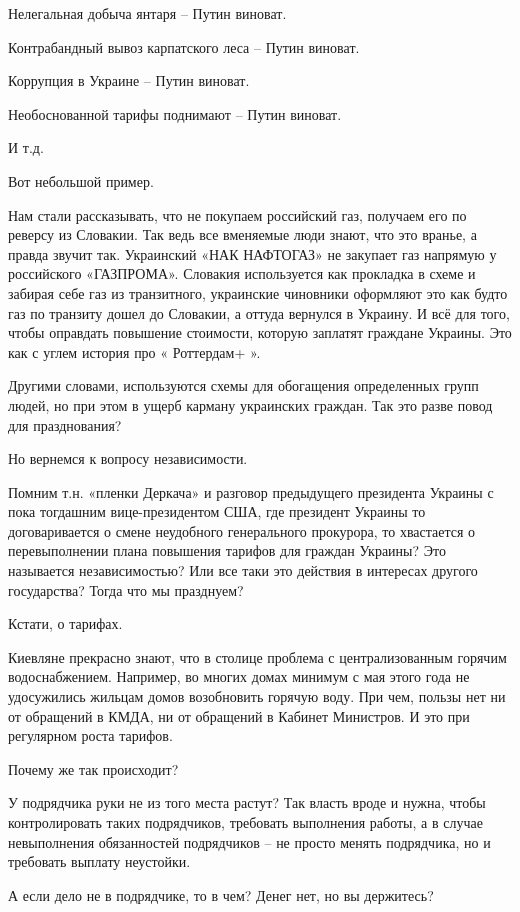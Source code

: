 Нелегальная добыча янтаря – Путин виноват.

Контрабандный вывоз карпатского леса – Путин виноват.

Коррупция в Украине – Путин виноват.

Необоснованной тарифы поднимают – Путин виноват.

И т.д.

Вот небольшой пример.

Нам стали рассказывать, что не покупаем российский газ, получаем его по реверсу
из Словакии. Так ведь все вменяемые люди знают, что это вранье, а правда звучит
так. Украинский «НАК НАФТОГАЗ» не закупает газ напрямую у российского
«ГАЗПРОМА». Словакия используется как прокладка в схеме и забирая себе газ из
транзитного, украинские чиновники оформляют это как будто газ по транзиту дошел
до Словакии, а оттуда вернулся в Украину. И всё для того, чтобы оправдать
повышение стоимости, которую заплатят граждане Украины. Это как с углем история
про « Роттердам+ ».

Другими словами, используются схемы для обогащения определенных групп людей, но
при этом в ущерб карману украинских граждан. Так это разве повод для
празднования?

Но вернемся к вопросу независимости.

Помним т.н. «пленки Деркача» и разговор предыдущего президента Украины с пока
тогдашним вице-президентом США, где президент Украины то договаривается о смене
неудобного генерального прокурора, то хвастается о перевыполнении плана
повышения тарифов для граждан Украины? Это называется независимостью? Или все
таки это действия в интересах другого государства? Тогда что мы празднуем?

Кстати, о тарифах.

Киевляне прекрасно знают, что в столице проблема с централизованным горячим
водоснабжением. Например, во многих домах минимум с мая этого года не
удосужились жильцам домов возобновить горячую воду. При чем, пользы нет ни от
обращений в КМДА, ни от обращений в Кабинет Министров. И это при регулярном
роста тарифов.

Почему же так происходит?

У подрядчика руки не из того места растут? Так власть вроде и нужна, чтобы
контролировать таких подрядчиков, требовать выполнения работы, а в случае
невыполнения обязанностей подрядчиков – не просто менять подрядчика, но и
требовать выплату неустойки.

А если дело не в подрядчике, то в чем? Денег нет, но вы держитесь?

